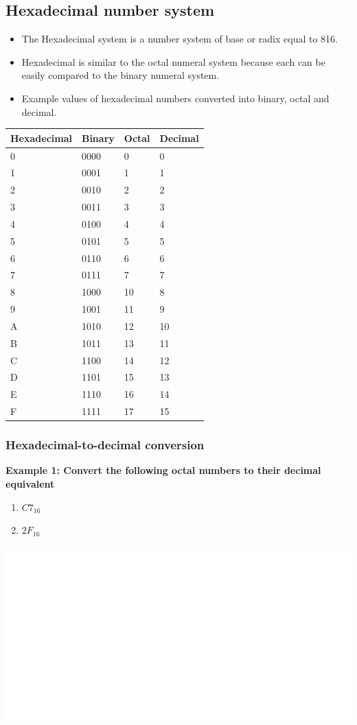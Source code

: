 \documentclass[]{book}
\providecommand{\tightlist}{%
  \setlength{\itemsep}{0pt}\setlength{\parskip}{0pt}}
\begin{document}
\hypertarget{hexadecimal-number-system}{%
\subsection{Hexadecimal number system}\label{hexadecimal-number-system}}

\begin{itemize}
\tightlist
\item
  The Hexadecimal system is a number system of base or radix equal to 816.
\item
  Hexadecimal is similar to the octal numeral system because each can be easily compared to the binary numeral system.
\item
  Example values of hexadecimal numbers converted into binary, octal and decimal.
\end{itemize}

\begin{longtable}[]{@{}llll@{}}
\toprule
Hexadecimal & Binary & Octal & Decimal\tabularnewline
\midrule
\endhead
0 & 0000 & 0 & 0\tabularnewline
1 & 0001 & 1 & 1\tabularnewline
2 & 0010 & 2 & 2\tabularnewline
3 & 0011 & 3 & 3\tabularnewline
4 & 0100 & 4 & 4\tabularnewline
5 & 0101 & 5 & 5\tabularnewline
6 & 0110 & 6 & 6\tabularnewline
7 & 0111 & 7 & 7\tabularnewline
8 & 1000 & 10 & 8\tabularnewline
9 & 1001 & 11 & 9\tabularnewline
A & 1010 & 12 & 10\tabularnewline
B & 1011 & 13 & 11\tabularnewline
C & 1100 & 14 & 12\tabularnewline
D & 1101 & 15 & 13\tabularnewline
E & 1110 & 16 & 14\tabularnewline
F & 1111 & 17 & 15\tabularnewline
\bottomrule
\end{longtable}

\hypertarget{hexadecimal-to-decimal-conversion}{%
\subsubsection{Hexadecimal-to-decimal conversion}\label{hexadecimal-to-decimal-conversion}}

\textbf{Example 1: Convert the following octal numbers to their decimal equivalent}

\begin{enumerate}
\def\labelenumi{(\alph{enumi})}
\tightlist
\item
  \(C7_{16}\)
\item
  \(2F_{16}\)
\end{enumerate}

\begin{center}\includegraphics[width=1\linewidth]{figure/NSbox14-1} \end{center}
\end{document}
